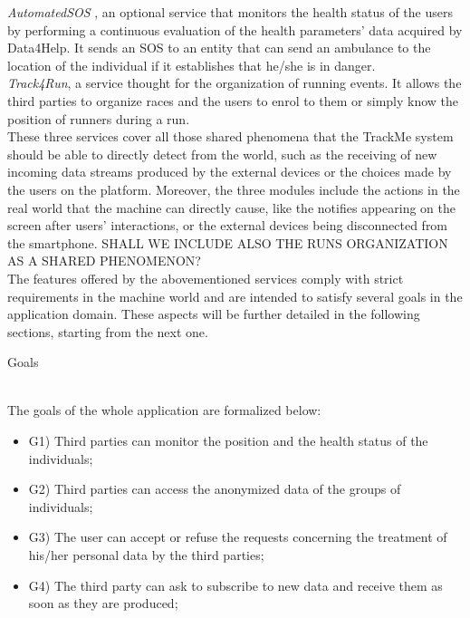 \documentclass{article}
\begin{document}
\begin{legal}
\begin{legal}
\begin{legal}
{\textit{AutomatedSOS }, an optional service that monitors the health status of the users by performing a continuous evaluation of the health parameters' data acquired by Data4Help. It sends an SOS to an entity that can send an ambulance to the location of the individual if it establishes that he/she is in danger.\\
\textit{Track4Run}, a service thought for the organization of running events. It allows the third parties to organize races and the users to enrol to them or simply know the position of runners during a run.\\
These three services cover all those shared phenomena that the TrackMe system should be able to directly detect from the world, such as the receiving of new incoming data streams produced by the external devices or the choices made by the users on the platform. Moreover, the three modules include the actions in the real world that the machine can directly cause, like the notifies appearing on the screen after users' interactions, or the external devices being disconnected from the smartphone. SHALL WE INCLUDE ALSO THE RUNS ORGANIZATION AS A SHARED PHENOMENON?\\
The features offered by the abovementioned services comply with strict requirements in the machine world and are intended to satisfy several goals in the application domain. These aspects will be further detailed in the following sections, starting from the next one.
			}\\
			\newpage
			\item Goals \\\\
			{\normalfont
			The goals of the whole application are formalized below:\\
				\begin{itemize}
				\item G1) Third parties can monitor the position and the health status of the individuals;\\
				\item G2) Third parties can access the anonymized data of the groups of individuals;\\
				\item G3) The user can accept or refuse the requests concerning the treatment of his/her personal data by the third parties;\\
				\item G4) The third party can ask to subscribe to new data and receive them as soon as they are produced;\\

\end{itemize}}
\end{legal}
\end{legal}
\end{legal}
\end{document}
